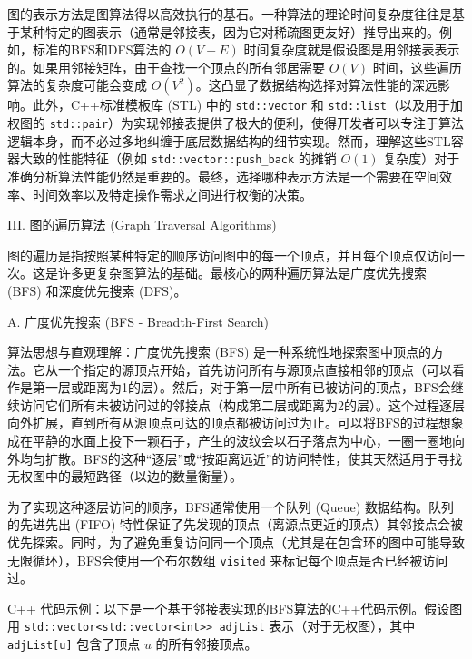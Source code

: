 图的表示方法是图算法得以高效执行的基石。一种算法的理论时间复杂度往往是基于某种特定的图表示（通常是邻接表，因为它对稀疏图更友好）推导出来的。例如，标准的BFS和DFS算法的 $O(V+E)$ 时间复杂度就是假设图是用邻接表表示的。如果用邻接矩阵，由于查找一个顶点的所有邻居需要 $O(V)$ 时间，这些遍历算法的复杂度可能会变成 $O(V^2)$。这凸显了数据结构选择对算法性能的深远影响。此外，C++标准模板库 (STL) 中的 \lstinline{std::vector} 和 \lstinline{std::list}（以及用于加权图的 \lstinline{std::pair}）为实现邻接表提供了极大的便利，使得开发者可以专注于算法逻辑本身，而不必过多地纠缠于底层数据结构的细节实现。然而，理解这些STL容器大致的性能特征（例如 \lstinline{std::vector::push_back} 的摊销 $O(1)$ 复杂度）对于准确分析算法性能仍然是重要的。最终，选择哪种表示方法是一个需要在空间效率、时间效率以及特定操作需求之间进行权衡的决策。

III. 图的遍历算法 (Graph Traversal Algorithms)

图的遍历是指按照某种特定的顺序访问图中的每一个顶点，并且每个顶点仅访问一次。这是许多更复杂图算法的基础。最核心的两种遍历算法是广度优先搜索 (BFS) 和深度优先搜索 (DFS)。

A. 广度优先搜索 (BFS - Breadth-First Search)

算法思想与直观理解：广度优先搜索 (BFS) 是一种系统性地探索图中顶点的方法。它从一个指定的源顶点开始，首先访问所有与源顶点直接相邻的顶点（可以看作是第一层或距离为1的层）。然后，对于第一层中所有已被访问的顶点，BFS会继续访问它们所有未被访问过的邻接点（构成第二层或距离为2的层）。这个过程逐层向外扩展，直到所有从源顶点可达的顶点都被访问过为止。可以将BFS的过程想象成在平静的水面上投下一颗石子，产生的波纹会以石子落点为中心，一圈一圈地向外均匀扩散。BFS的这种“逐层”或“按距离远近”的访问特性，使其天然适用于寻找无权图中的最短路径（以边的数量衡量）。

为了实现这种逐层访问的顺序，BFS通常使用一个队列 (Queue) 数据结构。队列的先进先出 (FIFO) 特性保证了先发现的顶点（离源点更近的顶点）其邻接点会被优先探索。同时，为了避免重复访问同一个顶点（尤其是在包含环的图中可能导致无限循环），BFS会使用一个布尔数组 \lstinline{visited} 来标记每个顶点是否已经被访问过。

C++ 代码示例：以下是一个基于邻接表实现的BFS算法的C++代码示例。假设图用 \lstinline{std::vector<std::vector<int>> adjList} 表示（对于无权图），其中 \lstinline{adjList[u]} 包含了顶点 $u$ 的所有邻接顶点。

